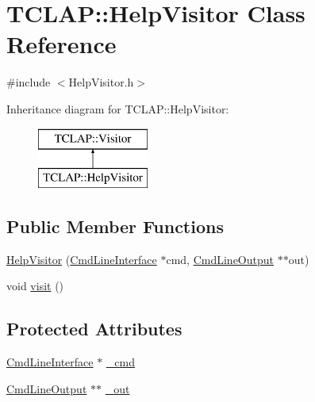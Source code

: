 \hypertarget{class_t_c_l_a_p_1_1_help_visitor}{}\section{T\+C\+L\+A\+P\+:\+:Help\+Visitor Class Reference}
\label{class_t_c_l_a_p_1_1_help_visitor}


{\ttfamily \#include $<$Help\+Visitor.\+h$>$}

Inheritance diagram for T\+C\+L\+A\+P\+:\+:Help\+Visitor\+:\begin{figure}[H]
\begin{center}
\leavevmode
\includegraphics[height=2.000000cm]{class_t_c_l_a_p_1_1_help_visitor}
\end{center}
\end{figure}
\subsection*{Public Member Functions}
\begin{DoxyCompactItemize}
\item 
\hyperlink{class_t_c_l_a_p_1_1_help_visitor_a425e96efa6950b1949f1f81d4ff133f1}{Help\+Visitor} (\hyperlink{class_t_c_l_a_p_1_1_cmd_line_interface}{Cmd\+Line\+Interface} $\ast$cmd, \hyperlink{class_t_c_l_a_p_1_1_cmd_line_output}{Cmd\+Line\+Output} $\ast$$\ast$out)
\item 
void \hyperlink{class_t_c_l_a_p_1_1_help_visitor_a157294efe254edb2b713b7c458aad3f2}{visit} ()
\end{DoxyCompactItemize}
\subsection*{Protected Attributes}
\begin{DoxyCompactItemize}
\item 
\hyperlink{class_t_c_l_a_p_1_1_cmd_line_interface}{Cmd\+Line\+Interface} $\ast$ \hyperlink{class_t_c_l_a_p_1_1_help_visitor_afc7e0402f4e09ab6eff91680ea87ea57}{\+\_\+cmd}
\item 
\hyperlink{class_t_c_l_a_p_1_1_cmd_line_output}{Cmd\+Line\+Output} $\ast$$\ast$ \hyperlink{class_t_c_l_a_p_1_1_help_visitor_ae12c2d2208b64377a6360fb335454877}{\+\_\+out}
\end{DoxyCompactItemize}


